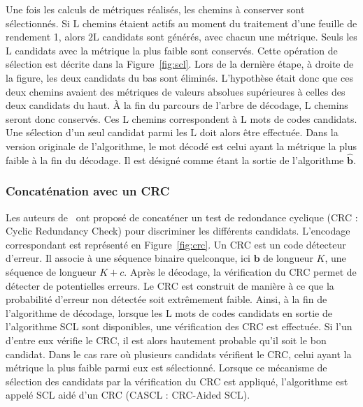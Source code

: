 Une fois les calculs de métriques réalisés, les chemins à conserver sont sélectionnés. Si $\mathrm{L}$ chemins étaient actifs au moment du traitement d'une feuille de rendement 1, alors $2\mathrm{L}$ candidats sont générés, avec chacun une métrique. Seuls les $\mathrm{L}$ candidats avec la métrique la plus faible sont conservés. Cette opération de sélection est décrite dans la Figure~\ref{fig:scl}. Lors de la dernière étape, à droite de la figure, les deux candidats du bas sont éliminés. L'hypothèse était donc que ces deux chemins avaient des métriques de valeurs absolues supérieures à celles des deux candidats du haut. \`A la fin du parcours de l'arbre de décodage, $\mathrm{L}$ chemins seront donc conservés. Ces $\mathrm{L}$ chemins correspondent à $\mathrm{L}$ mots de codes candidats. Une sélection d'un seul candidat parmi les $\mathrm{L}$ doit alors être effectuée. Dans la version originale de l'algorithme, le mot décodé est celui ayant la métrique la plus faible à la fin du décodage. Il est désigné comme étant la sortie de l'algorithme $\mathbold{\hat{b}}$.


\subsubsection{Concaténation avec un CRC}

Les auteurs de~\cite{tal_how_2013} ont proposé de concaténer un test de redondance cyclique (CRC : Cyclic Redundancy Check) pour discriminer les différents candidats. L'encodage correspondant est représenté en Figure~\ref{fig:crc}. Un CRC est un code détecteur d'erreur. Il associe à une séquence binaire quelconque, ici $\mathbold{b}$ de longueur $K$, une séquence de longueur $K+c$. Après le décodage, la vérification du CRC permet de détecter de potentielles erreurs. Le CRC est construit de manière à ce que la probabilité d'erreur non détectée soit extrêmement faible.
Ainsi, à la fin de l'algorithme de décodage, lorsque les $\mathrm{L}$ mots de codes candidats en sortie de l'algorithme SCL sont disponibles, une vérification des CRC est effectuée. Si l'un d'entre eux vérifie le CRC, il est alors hautement probable qu'il soit le bon candidat. Dans le cas rare où plusieurs candidats vérifient le CRC, celui ayant la métrique la plus faible parmi eux est sélectionné. Lorsque ce mécanisme de sélection des candidats par la vérification du CRC est appliqué, l'algorithme est appelé \og SCL aidé d'un CRC \fg (CASCL : CRC-Aided SCL).

